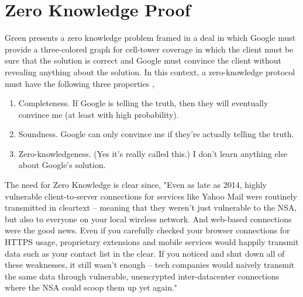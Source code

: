 \documentclass[10pt]{article}
\begin{document}
\section*{Zero Knowledge Proof}
Green presents a zero knowledge problem framed in a deal in which Google must provide a three-colored graph for cell-tower coverage in which the client must be sure that the solution is correct and Google must convince the client without revealing anything about the solution. \cite{zeroknow} In this context, a zero-knowledge protocol must have the following three properties \cite{zeroknow},
\begin{enumerate}
    \item Completeness. If Google is telling the truth, then they will eventually convince me (at least with high probability).
    \item Soundness. Google can only convince me if they're actually telling the truth. 
    \item Zero-knowledgeness. (Yes it's really called this.) I don't learn anything else about Google's solution.
\end{enumerate}
The need for Zero Knowledge is clear since, "Even as late as 2014, highly vulnerable client-to-server connections for services like Yahoo Mail were routinely transmitted in cleartext -- meaning that they weren't just vulnerable to the NSA, but also to everyone on your local wireless network. And web-based connections were the good news. Even if you carefully checked your browser connections for HTTPS usage, proprietary extensions and mobile services would happily transmit data such as your contact list in the clear. If you noticed and shut down all of these weaknesses, it still wasn't enough -- tech companies would naively transmit the same data through vulnerable, unencrypted inter-datacenter connections where the NSA could scoop them up yet again." \cite{networkhostile}
\end{document}
